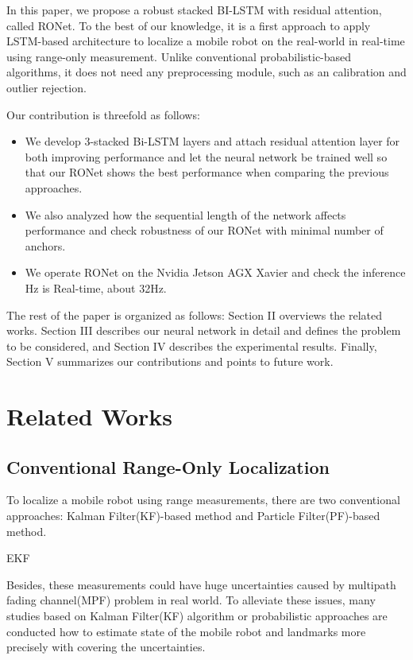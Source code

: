 \documentclass[letterpaper, 10 pt, conference]{ieeeconf}  %
\begin{document}
In this paper, we propose a robust stacked BI-LSTM with residual attention, called RONet. To the best of our knowledge, it is a first approach to apply LSTM-based architecture to localize a mobile robot on the real-world in real-time using range-only measurement. Unlike conventional probabilistic-based algorithms, it does not need any preprocessing module, such as an calibration and outlier rejection.

Our contribution is threefold as follows:
\begin{itemize}
	\item We develop 3-stacked Bi-LSTM layers and attach residual attention layer for both improving performance and let the neural network be trained well so that our RONet shows the best performance when comparing the previous approaches.
	\item We also analyzed how the sequential length of the network affects performance and check robustness of our RONet with minimal number of anchors.
	\item We operate RONet on the Nvidia Jetson AGX Xavier and check the inference Hz is Real-time, about 32Hz. 
	
\end{itemize}

The rest of the paper is organized as follows: Section II overviews the related works. Section III describes our neural network in detail and defines the problem to be considered, and Section IV describes the experimental results. Finally, Section V summarizes our contributions and points to future work.

\section{Related Works}
\subsection{Conventional Range-Only Localization}

To localize a mobile robot using range measurements, there are two conventional approaches: Kalman Filter(KF)-based method and Particle Filter(PF)-based method. 

EKF \cite{olson2006robust}

 Besides, these measurements could have huge uncertainties caused by multipath fading channel(MPF) problem\cite{li2017novel} in real world. To alleviate these issues, many studies based on Kalman Filter(KF) algorithm or probabilistic approaches are conducted how to estimate state of the mobile robot and landmarks more precisely with covering the uncertainties. 
\end{document}
